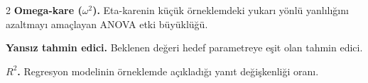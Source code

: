 \begin{multicols}{2}
\textbf{Omega-kare ($\omega^2$).} Eta-karenin küçük örneklemdeki yukarı
yönlü yanlılığını azaltmayı amaçlayan ANOVA etki büyüklüğü.\par\smallskip
\fi

\textbf{Yansız tahmin edici.} Beklenen değeri hedef parametreye eşit olan
tahmin edici.\par\smallskip

\textbf{$R^2$.} Regresyon modelinin örneklemde açıkladığı yanıt değişkenliği
oranı.\par\smallskip

\normalsize
\end{multicols}